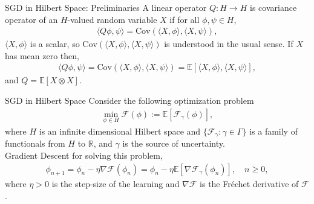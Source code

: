 \documentclass[dvipsnames, handout]{beamer}
\newcommand{\1}{\mathds{1}}	%
\begin{document}
\begin{frame}{SGD in Hilbert Space: Preliminaries}
    A linear operator $Q: H \rightarrow H$ is covariance operator of an $H$-valued random variable $X$ if for all $\phi, \psi \in H$,
    \begin{align*}
        \langle Q \phi, \psi \rangle = \text{Cov}(\langle X, \phi\rangle, \langle X, \psi\rangle),
    \end{align*}
    $\langle X, \phi\rangle$ is a scalar, so $\text{Cov}(\langle X, \phi\rangle, \langle X, \psi\rangle)$ is understood in the usual sense. If $X$ has mean zero then,
    \begin{align*}
        \langle Q \phi, \psi \rangle = \text{Cov}(\langle X, \phi\rangle, \langle X, \psi\rangle) = \mathbb{E}[\langle X, \phi\rangle, \langle X, \psi\rangle],
    \end{align*}
    and $Q = \mathbb{E}[X \otimes X]$.
\end{frame}


\begin{frame}{SGD in Hilbert Space}
    Consider the following optimization problem
    \begin{align*}
        \min_{\phi \in H} \mathcal{F}(\phi) := \mathbb{E}[\mathcal{F}_{\gamma}(\phi)],
    \end{align*}
    where $H$ is an infinite dimensional Hilbert space and $\{\mathcal{F}_{\gamma}: \gamma \in \Gamma\}$ is a family of functionals from $H$ to $\mathbb{R}$, and $\gamma$ is the source of uncertainty.\\
    Gradient Descent for solving this problem,
    \begin{align*}
        \phi_{n+1} = \phi_n - \eta \nabla \mathcal{F}(\phi_n) = \phi_n - \eta \mathbb{E}[\nabla \mathcal{F}_{\gamma}(\phi_n)], \quad n\geq 0,
    \end{align*}
    where $\eta > 0$ is the step-size of the learning and $\nabla \mathcal{F}$ is the Fréchet derivative of $\mathcal{F}$.
\end{frame}
\end{document}
